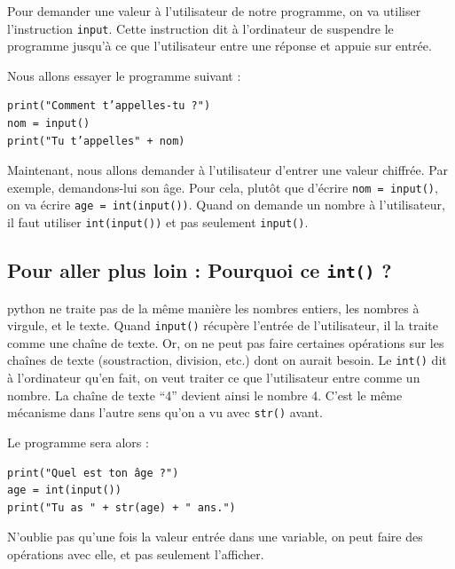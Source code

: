 \documentclass[a4paper,french,11pt]{article}
\begin{document}
Pour demander une valeur à l'utilisateur de notre programme, on va
utiliser l'instruction \texttt{input}. Cette instruction dit
à l'ordinateur de suspendre le programme jusqu'à ce que l'utilisateur
entre une réponse et appuie sur entrée.

Nous allons essayer le programme suivant :

\begin{verbatim}
print("Comment t’appelles-tu ?")
nom = input()
print("Tu t’appelles" + nom)
\end{verbatim}

Maintenant, nous allons demander à l'utilisateur d'entrer une valeur
chiffrée. Par exemple, demandons-lui son âge. Pour cela, plutôt que
d'écrire \texttt{nom = input()}, on va écrire
\texttt{age = int(input())}. Quand on demande un nombre à
l'utilisateur, il faut utiliser \texttt{int(input())} et pas
seulement \texttt{input()}.

\hypertarget{pour-aller-plus-loin-pourquoi-ce-int}{%
\subsection{\texorpdfstring{Pour aller plus loin : Pourquoi ce
\texttt{int()}
?}{Pour aller plus loin : Pourquoi ce  ?}}\label{pour-aller-plus-loin-pourquoi-ce-int}}

python ne traite pas de la même manière les nombres entiers, les nombres
à virgule, et le texte. Quand \texttt{input()} récupère
l'entrée de l'utilisateur, il la traite comme une chaîne de texte. Or,
on ne peut pas faire certaines opérations sur les chaînes de texte
(soustraction, division, etc.) dont on aurait besoin. Le
\texttt{int()} dit à l'ordinateur qu'en fait, on veut
traiter ce que l'utilisateur entre comme un nombre. La chaîne de texte
``4'' devient ainsi le nombre 4. C'est le même mécanisme dans l'autre
sens qu'on a vu avec \texttt{str()} avant.

Le programme sera alors :

\begin{verbatim}
print("Quel est ton âge ?")
age = int(input())
print("Tu as " + str(age) + " ans.")
\end{verbatim}

N'oublie pas qu'une fois la valeur entrée dans une variable, on peut
faire des opérations avec elle, et pas seulement l'afficher.
\end{document}
